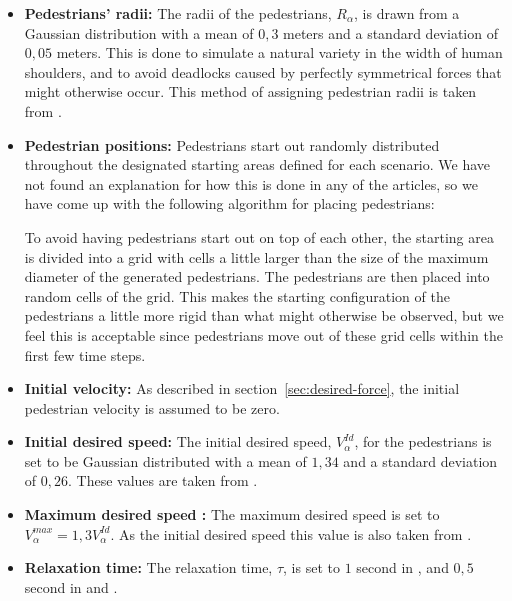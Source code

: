 \begin{itemize}
    \item \textbf{Pedestrians' radii:} The radii of the pedestrians, 
        $R_\alpha$, is drawn from a Gaussian distribution with a mean of $0,3$ 
        meters and a standard deviation of $0,05$ meters. This is done to 
        simulate a natural variety in the width of human shoulders, and to 
        avoid deadlocks caused by perfectly symmetrical forces that might 
        otherwise occur. This method of assigning pedestrian radii is taken 
        from \cite{helbing00}.
        
    \item \textbf{Pedestrian positions:} Pedestrians start out randomly 
        distributed throughout the designated starting areas defined for each 
        scenario. We have not found an explanation for how this is done in any 
        of the articles, so we have come up with the following algorithm for 
        placing pedestrians:

        To avoid having pedestrians start out on top of each other, the 
        starting area is divided into a grid with cells a little larger than 
        the size of the maximum diameter of the generated pedestrians. The 
        pedestrians are then placed into random cells of the grid. This makes 
        the starting configuration of the pedestrians a little more rigid than 
        what might otherwise be observed, but we feel this is acceptable since 
        pedestrians move out of these grid cells within the first few time 
        steps.
        
    \item \textbf{Initial velocity:} As described in 
        section~\ref{sec:desired-force}, the initial pedestrian velocity is 
        assumed to be zero.


    \item \textbf{Initial desired speed:} The initial desired speed, 
        $V^{Id}_\alpha$, for the pedestrians is set to be Gaussian 
        distributed with a mean of $1,34$ and a standard deviation of $0,26$.
	These values are taken from \cite{social-force}. 


    \item \textbf{Maximum desired speed :} The maximum desired speed is set to 
        $V_{\alpha}^{max}=1,3V^{Id}_\alpha$.
	As the initial desired speed this value is also taken from \cite{social-force}.
      
        
    \item \textbf{Relaxation time:} The relaxation time, $\tau$, is set to $1$ 
        second in \cite{self-org}, and $0,5$ second in \cite{social-force} and \cite{helbing00}. 
\end{itemize}


